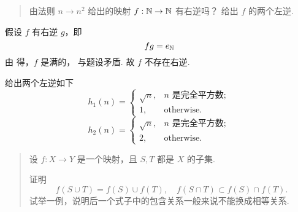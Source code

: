 \begin{quotation}
    由法则 $n \to n^2$ 给出的映射 $f: \mathbb{N} \to \mathbb{N}$ 有右逆吗？
    给出 $f$ 的两个左逆.
\end{quotation}

假设 $f$ 有右逆 $g$，即
\begin{equation}
    fg = e_{\mathbb{N}}
\end{equation}
由 得，$f$ 是满的，
与题设矛盾.
故 $f$ 不存在右逆.

给出两个左逆如下
\begin{equation}
    h_1(n) = \begin{cases}
        \sqrt{n}, & n \text{ 是完全平方数}; \\
        1, & \text{otherwise}.
    \end{cases}
\end{equation}
\begin{equation}
    h_2(n) = \begin{cases}
        \sqrt{n}, & n \text{ 是完全平方数}; \\
        2, & \text{otherwise}.
    \end{cases}
\end{equation}

\begin{quotation}
    设 $f: X \to Y$ 是一个映射，且 $S, T$ 都是 $X$ 的子集.

    证明
    \[
        f(S \cup T) = f(S) \cup f(T),
        \quad f(S \cap T) \subset f(S) \cap f(T).
    \]
    试举一例，说明后一个式子中的包含关系一般来说不能换成相等关系.
\end{quotation}

